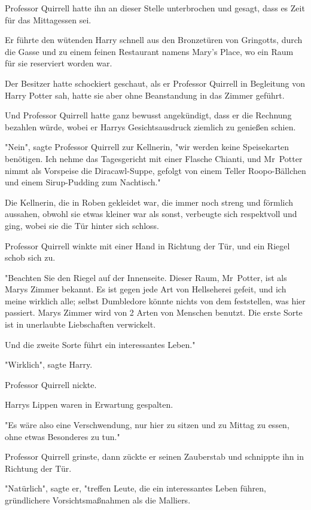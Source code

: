 {Professor Quirrell hatte ihn an dieser Stelle unterbrochen und gesagt, dass es Zeit für das Mittagessen sei.

Er führte den wütenden Harry schnell aus den Bronzetüren von Gringotts, durch die Gasse und zu einem feinen Restaurant namens Mary's Place, wo ein Raum für sie reserviert worden war.

Der Besitzer hatte schockiert geschaut, als er Professor Quirrell in Begleitung von Harry Potter sah, hatte sie aber ohne Beanstandung in das Zimmer geführt.

Und Professor Quirrell hatte ganz bewusst angekündigt, dass er die Rechnung bezahlen würde, wobei er Harrys Gesichtsausdruck ziemlich zu genießen schien.

"Nein", sagte Professor Quirrell zur Kellnerin, "wir werden keine Speisekarten benötigen. Ich nehme das Tagesgericht mit einer Flasche Chianti, und Mr~Potter nimmt als Vorspeise die Diracawl-Suppe, gefolgt von einem Teller Roopo-Bällchen und einem Sirup-Pudding zum Nachtisch."

Die Kellnerin, die in Roben gekleidet war, die immer noch streng und förmlich aussahen, obwohl sie etwas kleiner war als sonst, verbeugte sich respektvoll und ging, wobei sie die Tür hinter sich schloss.

Professor Quirrell winkte mit einer Hand in Richtung der Tür, und ein Riegel schob sich zu.

"Beachten Sie den Riegel auf der Innenseite. Dieser Raum, Mr~Potter, ist als Marys Zimmer bekannt. Es ist gegen jede Art von Hellseherei gefeit, und ich meine wirklich alle; selbst Dumbledore könnte nichts von dem feststellen, was hier passiert. Marys Zimmer wird von 2 Arten von Menschen benutzt. Die erste Sorte ist in unerlaubte Liebschaften verwickelt.

Und die zweite Sorte führt ein interessantes Leben."

"Wirklich", sagte Harry.

Professor Quirrell nickte.

Harrys Lippen waren in Erwartung gespalten.

"Es wäre also eine Verschwendung, nur hier zu sitzen und zu Mittag zu essen, ohne etwas Besonderes zu tun."

Professor Quirrell grinste, dann zückte er seinen Zauberstab und schnippte ihn in Richtung der Tür.

"Natürlich", sagte er, "treffen Leute, die ein interessantes Leben führen, gründlichere Vorsichtsmaßnahmen als die Malliers.

}

